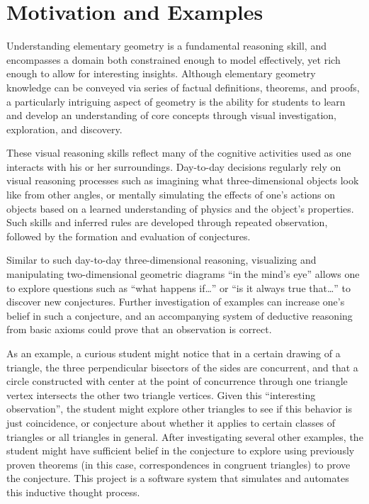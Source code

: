 \chapter{Motivation and Examples}
\label{chap:motivation}

Understanding elementary geometry is a fundamental reasoning skill,
and encompasses a domain both constrained enough to model effectively,
yet rich enough to allow for interesting insights.  Although
elementary geometry knowledge can be conveyed via series of factual
definitions, theorems, and proofs, a particularly intriguing aspect of
geometry is the ability for students to learn and develop an
understanding of core concepts through visual investigation,
exploration, and discovery.

These visual reasoning skills reflect many of the cognitive activities
used as one interacts with his or her surroundings.  Day-to-day
decisions regularly rely on visual reasoning processes such as
imagining what three-dimensional objects look like from other angles,
or mentally simulating the effects of one's actions on objects based
on a learned understanding of physics and the object's properties.
Such skills and inferred rules are developed through repeated
observation, followed by the formation and evaluation of conjectures.

Similar to such day-to-day three-dimensional reasoning, visualizing
and manipulating two-dimensional geometric diagrams ``in the mind's
eye'' allows one to explore questions such as ``what happens
if\ldots'' or ``is it always true that\ldots'' to discover new
conjectures.  Further investigation of examples can increase one's
belief in such a conjecture, and an accompanying system of deductive
reasoning from basic axioms could prove that an observation is
correct.

As an example, a curious student might notice that in a certain
drawing of a triangle, the three perpendicular bisectors of the sides
are concurrent, and that a circle constructed with center at the point
of concurrence through one triangle vertex intersects the other two
triangle vertices.  Given this ``interesting observation'', the
student might explore other triangles to see if this behavior is just
coincidence, or conjecture about whether it applies to certain classes
of triangles or all triangles in general.  After investigating several
other examples, the student might have sufficient belief in the
conjecture to explore using previously proven theorems (in this case,
correspondences in congruent triangles) to prove the conjecture.  This
project is a software system that simulates and automates this
inductive thought process.

